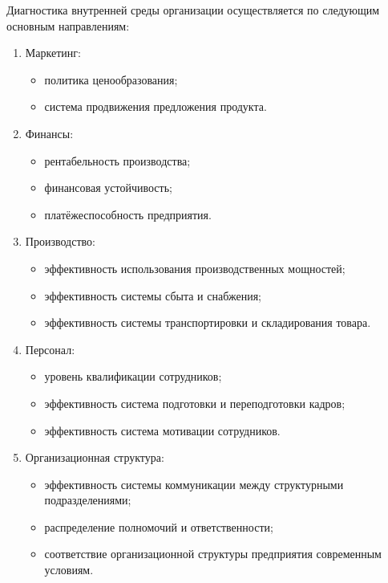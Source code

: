 \documentclass[12pt, russian, oneside, article]{ncc}
\begin{document}
Диагностика внутренней среды организации осуществляется по следующим основным направлениям:
\begin{enumerate}
\item Маркетинг:

\begin{itemize}
\item политика ценообразования;
\item система продвижения предложения продукта.
\end{itemize}

\item Финансы:

\begin{itemize}
\item рентабельность производства;
\item финансовая устойчивость;
\item платёжеспособность предприятия.
\end{itemize}

\item Производство:

\begin{itemize}
\item эффективность использования производственных мощностей;
\item эффективность системы сбыта и снабжения;
\item эффективность системы транспортировки и складирования товара.
\end{itemize}

\item Персонал:

\begin{itemize}
\item уровень квалификации сотрудников;
\item эффективность система подготовки и переподготовки кадров;
\item эффективность система мотивации сотрудников.
\end{itemize}

\item Организационная структура:

\begin{itemize}
\item эффективность системы коммуникации между структурными подразделениями;
\item распределение полномочий и  ответственности;
\item соответствие организационной структуры предприятия современным условиям.
\end{itemize}

\end{enumerate}
\end{document}
